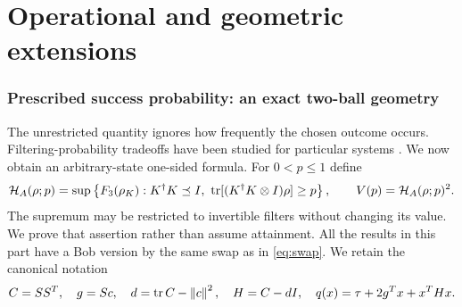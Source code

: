 \clearpage
\part*{Operational and geometric extensions}

\section{Prescribed success probability: an exact two-ball geometry}\label{sec:lens}
\label{sec:probability}

The unrestricted quantity ignores how frequently the chosen outcome occurs.
Filtering-probability tradeoffs have been studied for particular systems \cite{probabilityprior}. We now obtain an arbitrary-state one-sided formula. For $0<p\leq1$ define
\[
 \mathcal H_A(\rho;p)=\sup\left\{F_3(\rho_K):K^\dagger K\preceq I,
     \ \operatorname{tr}[(K^\dagger K\otimes I)\rho]\geq p\right\},
 \qquad V(p)=\mathcal H_A(\rho;p)^2.
\]
The supremum may be restricted to invertible filters without changing its
value. We prove that assertion rather than assume attainment. All the
results in this part have a Bob version by the same swap as in
\eqref{eq:swap}. We retain the canonical notation
\[
 C=SS^T,\quad g=Sc,\quad d=\operatorname{tr} C-\left\lVert c\right\rVert^2,\quad H=C-dI,
 \quad q(x)=\tau+2g^Tx+x^THx.
\]

